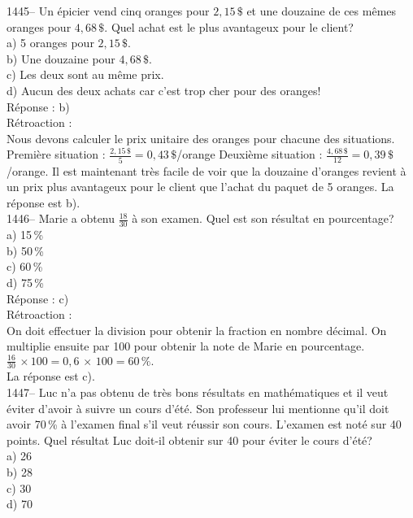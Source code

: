 1445-- Un \'epicier vend cinq oranges pour $2,15\,\$$ et une douzaine
de ces m\^emes oranges pour $4,68\,\$$. Quel achat est le plus
avantageux pour le client?\\
a) 5 oranges pour $2,15\,\$.$\\
b) Une douzaine pour $4,68\,\$.$\\
c) Les deux sont au m\^eme prix.\\
d) Aucun des deux achats car c'est trop cher pour des oranges!\\

R\'eponse : b)\\

R\'etroaction :\\
Nous devons calculer le prix unitaire des oranges pour chacune des
situations. \vskip10pt Premi\`ere situation :
$\frac{2,15\,\$}{5}=0,43\,\$$/orange \vskip 10pt Deuxi\`eme
situation : $\frac{4,68\,\$}{12}=0,39\,\$$/orange. \vskip 20pt
\noindent Il est maintenant tr\`es facile de voir que la douzaine
d'oranges revient \`a un prix
plus avantageux pour le client que l'achat du paquet de 5 oranges. La
r\'eponse est b).\\

1446-- Marie a obtenu $\frac{18}{30}$ \`a son examen. Quel est son
r\'esultat en
pourcentage?\\
a) 15\,\% \\
b) 50\,\% \\
c) 60\,\% \\
d) 75\,\% \\

R\'eponse : c)\\

R\'etroaction :\\
On doit effectuer la division pour obtenir la fraction en nombre
d\'ecimal. On multiplie ensuite par 100 pour obtenir la
note de Marie en pourcentage. \\

$\frac{16}{30}$$\,\times100 = 0,6\,\times\,100=60\,\%.$\\[3mm]
La r\'eponse est c).\\

1447-- Luc n'a pas obtenu de tr\`es bons r\'esultats en
math\'ematiques et il veut \'eviter d'avoir \`a suivre un cours
d'\'et\'e. Son professeur lui mentionne qu'il doit avoir 70\,\% \`a
l'examen final s'il veut r\'eussir son cours. L'examen est not\'e
sur 40 points. Quel r\'esultat Luc doit-il obtenir sur 40 pour
\'eviter le cours
d'\'et\'e? \\
a) 26\\
b) 28\\
c) 30\\
d) 70\\

